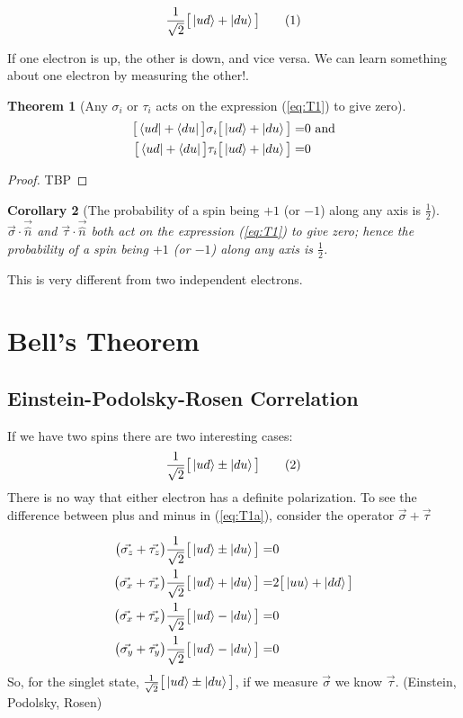 \documentclass[]{article}
\newcommand\numberthis{\addtocounter{equation}{1}\tag{\theequation}}
\newtheorem{thm}{Theorem}
\newtheorem{cor}[thm]{Corollary}
\begin{document}
\begin{align*}
	\frac{1}{\sqrt{2}}\big[\ket{ud}+\ket{du}\big] \numberthis \label{eq:T1}
\end{align*}

If one electron is up, the other is down, and vice versa. We can learn something about one electron by measuring the other!.

\begin{thm}[Any $\sigma_i$ or $\tau_i$ acts on the expression (\ref{eq:T1}) to give zero]
	\begin{align*}
		\big[\bra{ud}+\bra{du}\big]\sigma_i\big[\ket{ud}+\ket{du}\big]=&0 \text{ and}\\
		\big[\bra{ud}+\bra{du}\big]\tau_i\big[\ket{ud}+\ket{du}\big]=&0
	\end{align*}
\end{thm}
\begin{proof}
	TBP
\end{proof}
\begin{cor}[The probability of a spin being $+1$ (or $-1$) along any axis is $\frac{1}{2}$]
	$\vec{\sigma}\cdot\vec{\hat{n}}$ and $\vec{\tau}\cdot\vec{\hat{n}}$ both  act on the expression (\ref{eq:T1}) to give zero; hence the probability of a spin being $+1$ (or $-1$) along any axis is $\frac{1}{2}$.
\end{cor}

This is very different from two independent electrons.

\section{Bell's Theorem}

\subsection{Einstein-Podolsky-Rosen Correlation}

If we have two spins there are two interesting cases:
\begin{align*}
	\frac{1}{\sqrt{2}}\big[\ket{ud}\pm\ket{du}\big] \numberthis \label{eq:T1a}
\end{align*}
There is no way that either electron has a definite polarization. To see the difference between plus and minus in (\ref{eq:T1a}), consider the operator $\vec{\sigma} + \vec{\tau}$

\begin{align*}
	\big(\vec{\sigma_z} + \vec{\tau_z}\big)\frac{1}{\sqrt{2}}\big[\ket{ud}\pm\ket{du}\big]=& 0\\
	\big(\vec{\sigma_x} + \vec{\tau_x}\big)\frac{1}{\sqrt{2}}\big[\ket{ud}+\ket{du}\big]=& 2 \big[\ket{uu}+\ket{dd}\big]\\
	\big(\vec{\sigma_x} + \vec{\tau_x}\big)\frac{1}{\sqrt{2}}\big[\ket{ud}-\ket{du}\big]=& 0\\
	\big(\vec{\sigma_y} + \vec{\tau_y}\big)\frac{1}{\sqrt{2}}\big[\ket{ud}-\ket{du}\big]=& 0
\end{align*}
So, for the singlet state, $\frac{1}{\sqrt{2}}\big[\ket{ud}\pm\ket{du}\big]$, if we measure $\vec{\sigma}$ we know $\vec{\tau}$. (Einstein, Podolsky, Rosen)\cite{einstein1935can}
\end{document}
